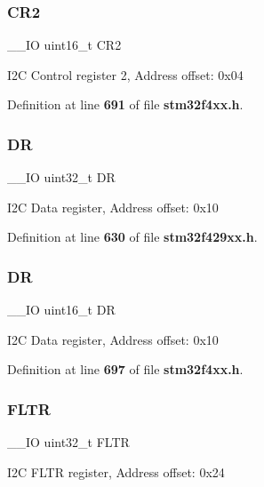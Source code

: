 \subsubsection{C\+R2\hspace{0.1cm}{\footnotesize\ttfamily [2/2]}}
{\footnotesize\ttfamily \+\_\+\+\_\+\+IO uint16\+\_\+t C\+R2}

I2C Control register 2, Address offset\+: 0x04 

Definition at line \textbf{ 691} of file \textbf{ stm32f4xx.\+h}.

\mbox{\label{structI2C__TypeDef_a3df0d8dfcd1ec958659ffe21eb64fa94}} 
\subsubsection{DR\hspace{0.1cm}{\footnotesize\ttfamily [1/2]}}
{\footnotesize\ttfamily \+\_\+\+\_\+\+IO uint32\+\_\+t DR}

I2C Data register, Address offset\+: 0x10 

Definition at line \textbf{ 630} of file \textbf{ stm32f429xx.\+h}.

\mbox{\label{structI2C__TypeDef_a0a1acc0425516ff7969709d118b96a3b}} 
\subsubsection{DR\hspace{0.1cm}{\footnotesize\ttfamily [2/2]}}
{\footnotesize\ttfamily \+\_\+\+\_\+\+IO uint16\+\_\+t DR}

I2C Data register, Address offset\+: 0x10 

Definition at line \textbf{ 697} of file \textbf{ stm32f4xx.\+h}.

\mbox{\label{structI2C__TypeDef_aa23ced8246d69edb9261a8de1f1e253f}} 
\subsubsection{F\+L\+TR}
{\footnotesize\ttfamily \+\_\+\+\_\+\+IO uint32\+\_\+t F\+L\+TR}

I2C F\+L\+TR register, Address offset\+: 0x24 

